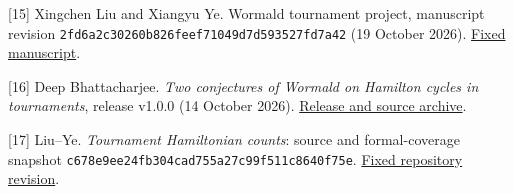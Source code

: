 \documentclass[11pt,a4paper]{article}
\begin{document}
{[}15{]} Xingchen Liu and Xiangyu Ye. Wormald tournament project, manuscript revision \nolinkurl{2fd6a2c30260b826feef71049d7d593527fd7a42} (19 October 2026). \href{https://github.com/LStar404/wormald-tournament-conjectures/blob/2fd6a2c30260b826feef71049d7d593527fd7a42/docs/paper.zh.md}{Fixed manuscript}.

{[}16{]} Deep Bhattacharjee. \emph{Two conjectures of Wormald on Hamilton cycles in tournaments}, release v1.0.0 (14 October 2026). \href{https://github.com/creelie/Breakthrough-problems-1/releases/tag/v1.0.0}{Release and source archive}.

{[}17{]} Liu--Ye. \emph{Tournament Hamiltonian counts}: source and formal-coverage snapshot \nolinkurl{c678e9ee24fb304cad755a27c99f511c8640f75e}. \href{https://github.com/LStar404/tournament-hamiltonian-counts-20261028/tree/c678e9ee24fb304cad755a27c99f511c8640f75e}{Fixed repository revision}.
\end{document}
